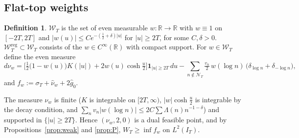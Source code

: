 \documentclass[11pt]{amsart}
\theoremstyle{definition}
\newtheorem{definition}[theorem]{Definition}
\theoremstyle{remark}
\newcommand{\R}{\mathbb R}
\newcommand{\IT}{I_T}
\newcommand{\sT}{\sigma_T}
\newcommand{\gh}[1]{\widehat g_{#1}}
\newcommand{\nuh}{\widehat\nu}
\newcommand{\Wcl}{\mathcal W_T}
\newcommand{\NT}{\mathcal N_T}
\begin{document}
\subsection{Flat-top weights}
\begin{definition}\label{def:W}
$\Wcl$ is the set of even measurable $w:\R\to\R$ with $w\equiv1$ on $[-2T,2T]$ and
$|w(u)|\le Ce^{-(\frac12+\delta)|u|}$ for $|u|\ge2T$, for some $C,\delta>0$. $\Wcl^{\mathrm{reg}}\subset\Wcl$
consists of the $w\in C^\infty(\R)$ with compact support. For $w\in\Wcl$ define the even measure
\begin{equation}\label{eq:nuw}
d\nu_w=\Big[\tfrac12\big(1-w(u)\big)K(|u|)+2w(u)\cosh\tfrac u2\Big]\mathbf 1_{|u|\ge2T}\,du
-\sum_{n\notin\NT}\tfrac{v_n}2\,w(\log n)\,\big(\delta_{\log n}+\delta_{-\log n}\big),
\end{equation}
and $f_w:=\sT+\nuh_w+2\gh0$.
\end{definition}
The measure $\nu_w$ is finite ($K$ is integrable on $[2T,\infty)$, $|w|\cosh\frac u2$ is
integrable by the decay condition, and $\sum_nv_n|w(\log n)|\le2C\sum\Lambda(n)n^{-1-\delta}$) and
supported in $\{|u|\ge2T\}$. Hence $(\nu_w,2,0)$ is a dual feasible point, and by
Propositions~\ref{prop:weak} and \ref{prop:P}, $W_T\ge\inf f_w$ on $L^2(\IT)$.
\end{document}
